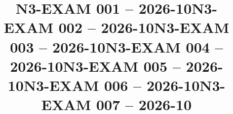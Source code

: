 \documentclass{ip-exam}
\title{N3-EXAM 001 -- 2026-10}
\begin{document}
\makeexamheader








\cleartoeven
\setcounter{questioncounter}{0}
\setcounter{page}{1}
\title{N3-EXAM 002 -- 2026-10}
\makeexamheader








\cleartoeven
\setcounter{questioncounter}{0}
\setcounter{page}{1}
\title{N3-EXAM 003 -- 2026-10}
\makeexamheader








\cleartoeven
\setcounter{questioncounter}{0}
\setcounter{page}{1}
\title{N3-EXAM 004 -- 2026-10}
\makeexamheader








\cleartoeven
\setcounter{questioncounter}{0}
\setcounter{page}{1}
\title{N3-EXAM 005 -- 2026-10}
\makeexamheader








\cleartoeven
\setcounter{questioncounter}{0}
\setcounter{page}{1}
\title{N3-EXAM 006 -- 2026-10}
\makeexamheader








\cleartoeven
\setcounter{questioncounter}{0}
\setcounter{page}{1}
\title{N3-EXAM 007 -- 2026-10}
\makeexamheader
\end{document}
